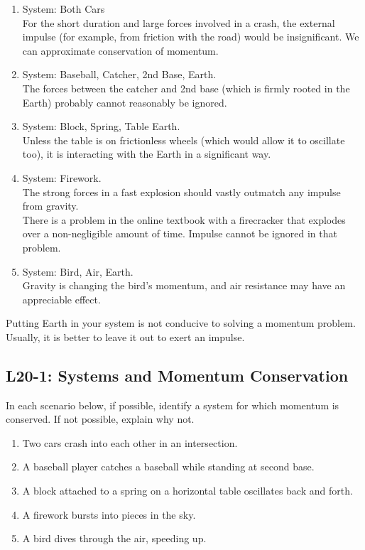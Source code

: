 \documentclass[]{article}
\newcommand{\Week}{20}
\begin{document}
\newpage
\begin{TeacherMargin}
\begin{enumerate}[(1)]
	\item System: Both Cars \\
	For the short duration and large forces involved in a crash, the external impulse (for example, from friction with the road) would be insignificant. We can approximate conservation of momentum.
	\item System: Baseball, Catcher, 2nd Base, {\color{violet}Earth}. \\
	The forces between the catcher and 2nd base (which is firmly rooted in the Earth) probably cannot reasonably be ignored.
	\item System: Block, Spring, Table {\color{violet}Earth}. \\
	Unless the table is on frictionless wheels (which would allow it to oscillate too), it is interacting with the Earth in a significant way.
	\item System: Firework. \\
	The strong forces in a fast explosion should vastly outmatch any impulse from gravity. \\
	There is a problem in the online textbook with a firecracker that explodes over a non-negligible amount of time. Impulse cannot be ignored in that problem.
	\item System: Bird, Air, {\color{violet}Earth}. \\
	Gravity is changing the bird's momentum, and air resistance may have an appreciable effect.
\end{enumerate}
{\color{violet}Putting Earth in your system is not conducive to solving a momentum problem. Usually, it is better to leave it out to exert an impulse.}
\end{TeacherMargin}
\begin{PresentSpace}
\vspace{-10pt}
\section*{L\Week-1: Systems and Momentum Conservation}
\vspace{-5pt}
In each scenario below, if possible, identify a system for which momentum is conserved. If not possible, explain why not.
\begin{enumerate}[(1)]
	\item Two cars crash into each other in an intersection.
	\item A baseball player catches a baseball while standing at second base.
	\item A block attached to a spring on a horizontal table oscillates back and forth.
	\item A firework bursts into pieces in the sky.
	\item A bird dives through the air, speeding up.
\end{enumerate}
\end{PresentSpace}
\end{document}
